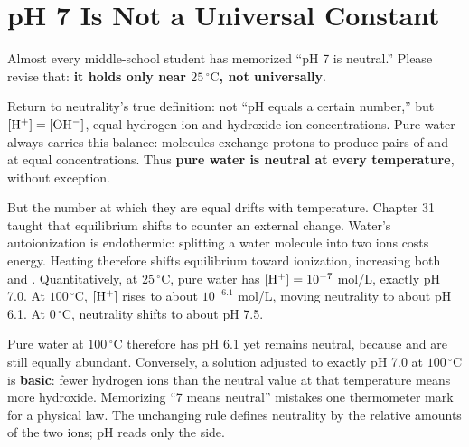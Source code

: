 \section{pH 7 Is Not a Universal Constant}

Almost every middle-school student has memorized ``pH 7 is neutral.'' Please revise that: \textbf{it holds only near $25\,^{\circ}\mathrm{C}$, not universally}.

Return to neutrality's true definition: not ``pH equals a certain number,'' but $[\mathrm{H^+}]=[\mathrm{OH^-}]$, equal hydrogen-ion and hydroxide-ion concentrations. Pure water always carries this balance: molecules exchange protons to produce pairs of  and  at equal concentrations. Thus \textbf{pure water is neutral at every temperature}, without exception.

But the number at which they are equal drifts with temperature. Chapter 31 taught that equilibrium shifts to counter an external change. Water's autoionization is endothermic: splitting a water molecule into two ions costs energy. Heating therefore shifts equilibrium toward ionization, increasing both  and . Quantitatively, at $25\,^{\circ}\mathrm{C}$, pure water has $[\mathrm{H^+}]=10^{-7}$ mol/L, exactly pH 7.0. At $100\,^{\circ}\mathrm{C}$, $[\mathrm{H^+}]$ rises to about $10^{-6.1}$ mol/L, moving neutrality to about pH 6.1. At $0\,^{\circ}\mathrm{C}$, neutrality shifts to about pH 7.5.

Pure water at $100\,^{\circ}\mathrm{C}$ therefore has pH 6.1 yet remains neutral, because  and  are still equally abundant. Conversely, a solution adjusted to exactly pH 7.0 at $100\,^{\circ}\mathrm{C}$ is \textbf{basic}: fewer hydrogen ions than the neutral value at that temperature means more hydroxide. Memorizing ``7 means neutral'' mistakes one thermometer mark for a physical law. The unchanging rule defines neutrality by the relative amounts of the two ions; pH reads only the  side.

